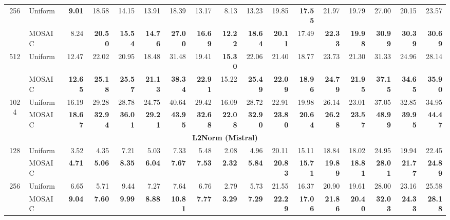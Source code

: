 \begin{table}[tp]
\begin{tabular}{@{} c l rrrr rrrr rrrr rrr @{}}
    \cmidrule(l){1-17}
    \multirow{2}{*}{256} & Uniform & \textbf{9.01} & 18.58 & 14.15 & 13.91 & 18.39 & 13.17 & 8.13 & 13.23 & 19.85 & \textbf{17.55} & 21.97 & 19.79 & 27.00 & 20.15 & 23.57 \\
     & MOSAIC & 8.24 & \textbf{20.50} & \textbf{15.54} & \textbf{14.76} & \textbf{27.00} & \textbf{16.69} & \textbf{12.22} & \textbf{18.64} & \textbf{20.11} & 17.49 & \textbf{22.33} & \textbf{19.98} & \textbf{30.99} & \textbf{30.39} & \textbf{30.69} \\
    \cmidrule(l){1-17}
    \multirow{2}{*}{512} & Uniform & 12.47 & 22.02 & 20.95 & 18.48 & 31.48 & 19.41 & \textbf{15.30} & 22.06 & 21.40 & 18.77 & 23.73 & 21.30 & 31.33 & 24.96 & 28.14 \\
     & MOSAIC & \textbf{12.65} & \textbf{25.18} & \textbf{25.57} & \textbf{21.13} & \textbf{38.34} & \textbf{22.91} & 15.22 & \textbf{25.49} & \textbf{22.09} & \textbf{18.96} & \textbf{24.79} & \textbf{21.95} & \textbf{37.15} & \textbf{34.65} & \textbf{35.90} \\
    \cmidrule(l){1-17}
    \multirow{2}{*}{1024} & Uniform & 16.19 & 29.28 & 28.78 & 24.75 & 40.64 & 29.42 & 16.09 & 28.72 & 22.91 & 19.98 & 26.14 & 23.01 & 37.05 & 32.85 & 34.95 \\
     & MOSAIC & \textbf{18.67} & \textbf{32.94} & \textbf{36.01} & \textbf{29.21} & \textbf{43.95} & \textbf{32.68} & \textbf{22.08} & \textbf{32.90} & \textbf{23.80} & \textbf{20.64} & \textbf{26.28} & \textbf{23.57} & \textbf{48.99} & \textbf{39.95} & \textbf{44.47} \\
    \midrule
    \multicolumn{17}{c}{\textbf{L2Norm (Mistral)}} \\
    \midrule
    \multirow{2}{*}{128} & Uniform & 3.52 & 4.35 & 7.21 & 5.03 & 7.33 & 5.48 & 2.08 & 4.96 & 20.11 & 15.11 & 18.84 & 18.02 & 24.95 & 19.94 & 22.45 \\
     & MOSAIC & \textbf{4.71} & \textbf{5.06} & \textbf{8.35} & \textbf{6.04} & \textbf{7.67} & \textbf{7.53} & \textbf{2.32} & \textbf{5.84} & \textbf{20.83} & \textbf{15.71} & \textbf{19.89} & \textbf{18.81} & \textbf{28.01} & \textbf{21.77} & \textbf{24.89} \\
    \cmidrule(l){1-17}
    \multirow{2}{*}{256} & Uniform & 6.65 & 5.71 & 9.44 & 7.27 & 7.64 & 6.76 & 2.79 & 5.73 & 21.55 & 16.37 & 20.90 & 19.61 & 28.00 & 23.16 & 25.58 \\
     & MOSAIC & \textbf{9.04} & \textbf{7.60} & \textbf{9.99} & \textbf{8.88} & \textbf{10.81} & \textbf{7.77} & \textbf{3.29} & \textbf{7.29} & \textbf{22.29} & \textbf{17.06} & \textbf{21.86} & \textbf{20.40} & \textbf{32.03} & \textbf{24.33} & \textbf{28.18} \\

\end{tabular}
\end{table}
